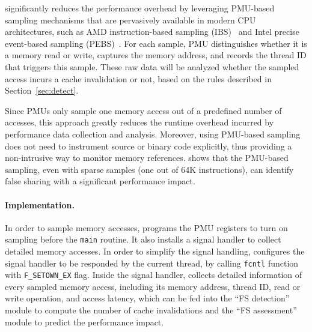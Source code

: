 \cheetah{} significantly reduces the performance overhead by leveraging PMU-based sampling mechanisms that are pervasively available in modern CPU architectures, such as AMD instruction-based sampling (IBS)~\cite{AMDIBS:07} and Intel precise event-based sampling (PEBS)~\cite{IntelArch:PEBS:Sept09}. For each sample, PMU distinguishes whether it is a memory read or write, captures the memory address, and records the thread ID that triggers this sample. These raw data will be analyzed whether the sampled access incurs a cache invalidation or not, based on the rules described in Section~\ref{sec:detect}.

Since PMUs only sample one memory access out of a predefined number of accesses, this approach greatly reduces the runtime overhead incurred by performance data collection and analysis. Moreover, using PMU-based sampling does not need to instrument source or binary code explicitly, thus providing a non-intrusive way to monitor memory references. \cheetah{} shows that the PMU-based sampling, even with sparse samples (one out of 64K instructions), can identify false sharing with a significant performance impact.
 

\paragraph{Implementation.} 

In order to sample memory accesses, \cheetah{} programs the PMU registers to turn on sampling before the \texttt{main} routine. It also installs a signal handler to collect detailed memory accesses. In order to simplify the signal handling, \Cheetah{} configures the signal handler to be responded by the current thread, by calling \texttt{fcntl} function with \texttt{F\_SETOWN\_EX} flag. Inside the signal handler, \Cheetah{} collects detailed information of every sampled memory access, including its memory address, thread ID, read or write operation, and access latency, which can be fed into the ``FS detection'' module to compute the number of cache invalidations and the ``FS assessment'' module to predict the performance impact.

